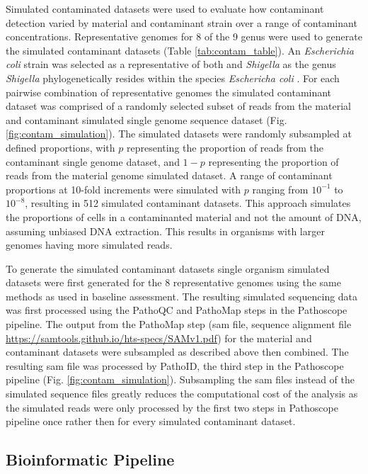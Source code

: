 \documentclass[fleqn,10pt,lineno]{wlpeerj}\usepackage[]{graphicx}\usepackage[]{color}
\begin{document}
Simulated contaminated datasets were used to evaluate how contaminant detection varied by material and contaminant strain over a range of contaminant concentrations.
Representative genomes for 8 of the 9 genus were used to generate the simulated contaminant datasets (Table \ref{tab:contam_table}).
An \textit{Escherichia coli} strain was selected as a representative of both  and \textit{Shigella} as the genus \textit{Shigella} phylogenetically resides within the species \textit{Eschericha coli} \citep{lan2002escherichia}.
For each pairwise combination of representative genomes the simulated contaminant dataset was comprised of a randomly selected subset of reads from the material and contaminant simulated single genome sequence dataset (Fig. \ref{fig:contam_simulation}).
The simulated datasets were randomly subsampled at defined proportions, with $p$ representing the proportion of reads from the contaminant single genome dataset, and $1-p$ representing the proportion of reads from the material genome simulated dataset.
A range of contaminant proportions at 10-fold increments were simulated with $p$ ranging from $10^{-1}$ to $10^{-8}$, resulting in 512 simulated contaminant datasets.
This approach simulates the proportions of cells in a contaminanted material and not the amount of DNA, assuming unbiased DNA extraction. 
This results in organisms with larger genomes having more simulated reads.  

To generate the simulated contaminant datasets single organism simulated datasets were first generated for the 8 representative genomes using the same methods as used in baseline assessment.
The resulting simulated sequencing data was first processed using the PathoQC and PathoMap steps in the Pathoscope pipeline.
The output from the PathoMap step (sam file, sequence alignment file \url{https://samtools.github.io/hts-specs/SAMv1.pdf}) for the material and contaminant datasets were subsampled as described above then combined. 
The resulting sam file was processed by PathoID, the third step in the Pathoscope pipeline (Fig. \ref{fig:contam_simulation}).
Subsampling the sam files instead of the simulated sequence files greatly reduces the computational cost of the analysis as the simulated reads were only processed by the first two steps in Pathoscope pipeline once rather then for every simulated contaminant dataset.


\subsection*{Bioinformatic Pipeline}
\end{document}
